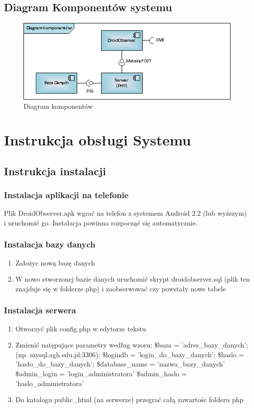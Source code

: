 \documentclass[11pt,a4paper]{article}
\begin{document}
\subsection {Diagram Komponentów systemu}
\begin{figure}[h]
    \includegraphics[scale=0.6]{component.png}
    \caption{Diagram komponentów}
 \end{figure}

\newpage
\section {Instrukcja obsługi Systemu}
\subsection{Instrukcja instalacji}

\subsubsection{Instalacja aplikacji na telefonie}
Plik DroidObserver.apk wgrać na telefon z systemem Android 2.2 (lub wyższym) i uruchomić go.
Instalacja powinna rozpocząć się automatycznie.

\subsubsection{Instalacja bazy danych}
\begin{enumerate}
\item Założyc nową bazę danych
\item W nowo stworzonej bazie danych uruchomić skrypt droidobserver.sql (plik ten znajduje się w folderze php) i zaobserwować czy powstały nowe tabele
\end{enumerate}

\subsubsection{Instalacja serwera}
\begin{enumerate}
\item Otworzyć plik config.php w edytorze tekstu
\item Zmienić natępujące parametry według wzoru:
\subitem \$baza = 'adres\_bazy\_danych';  (np. mysql.agh.edu.pl:3306);
\subitem \$logindb = 'login\_do\_bazy\_danych'; 
\subitem \$haslo = 'hasło\_do\_bazy\_danych';
\subitem \$database\_name = 'nazwa\_bazy\_danych'
\subitem \$admin\_login = 'login\_administratora'
\subitem \$admin\_haslo = 'haslo\_administratora'
\item Do katalogu public\_html (na serwerze) przegrać całą zawartośc folderu php
\end{enumerate}
\end{document}
